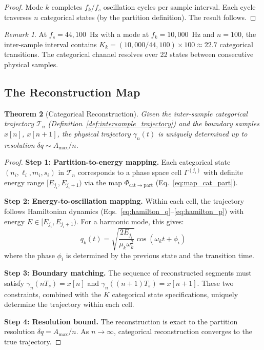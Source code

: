 \documentclass[twocolumn,10pt]{article}
\newtheorem{theorem}{Theorem}[section]
\theoremstyle{remark}
\newtheorem{remark}[theorem]{Remark}
\newcommand{\calT}{\mathcal{T}}
\begin{document}
\begin{proof}
Mode $k$ completes $f_k / f_s$ oscillation cycles per sample interval. Each cycle traverses $n$ categorical states (by the partition definition). The result follows.
\end{proof}

\begin{remark}
At $f_s = 44{,}100$~Hz with a mode at $f_k = 10{,}000$~Hz and $n = 100$, the inter-sample interval contains $K_k = (10{,}000/44{,}100) \times 100 \approx 22.7$ categorical transitions. The categorical channel resolves over 22 states between consecutive physical samples.
\end{remark}

\subsection{The Reconstruction Map}

\begin{theorem}[Categorical Reconstruction]
\label{thm:reconstruction}
Given the inter-sample categorical trajectory $\calT_n$ (Definition~\ref{def:intersample_trajectory}) and the boundary samples $x[n]$, $x[n+1]$, the physical trajectory $\gamma_n(t)$ is uniquely determined up to resolution $\delta q \sim A_{\max}/n$.
\end{theorem}

\begin{proof}
\textbf{Step 1: Partition-to-energy mapping.}
Each categorical state $(n_i, \ell_i, m_i, s_i)$ in $\calT_n$ corresponds to a phase space cell $\Gamma^{(j_i)}$ with definite energy range $[E_{j_i}, E_{j_i+1})$ via the map $\Phi_{\mathrm{cat} \to \mathrm{part}}$ (Eq.~\ref{eq:map_cat_part}).

\textbf{Step 2: Energy-to-oscillation mapping.}
Within each cell, the trajectory follows Hamiltonian dynamics (Eqs.~\ref{eq:hamilton_q}--\ref{eq:hamilton_p}) with energy $E \in [E_{j_i}, E_{j_i+1})$. For a harmonic mode, this gives:
\begin{equation}
    q_k(t) = \sqrt{\frac{2E_{j_i}}{\mu_k \omega_k^2}} \cos(\omega_k t + \phi_i)
    \label{eq:reconstructed_trajectory}
\end{equation}
where the phase $\phi_i$ is determined by the previous state and the transition time.

\textbf{Step 3: Boundary matching.}
The sequence of reconstructed segments must satisfy $\gamma_n(nT_s) = x[n]$ and $\gamma_n((n+1)T_s) = x[n+1]$. These two constraints, combined with the $K$ categorical state specifications, uniquely determine the trajectory within each cell.

\textbf{Step 4: Resolution bound.}
The reconstruction is exact to the partition resolution $\delta q = A_{\max}/n$. As $n \to \infty$, categorical reconstruction converges to the true trajectory.
\end{proof}
\end{document}
